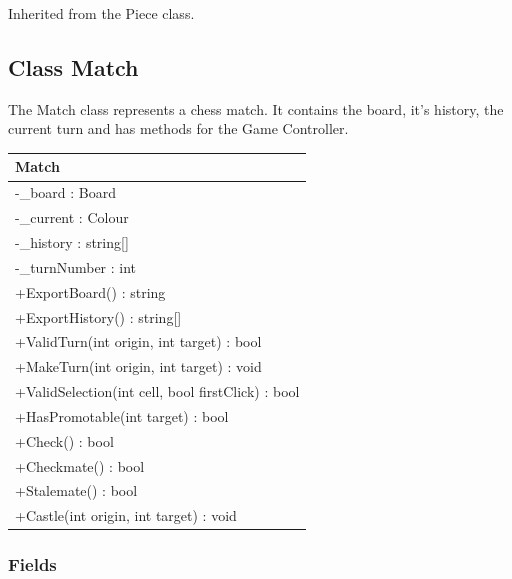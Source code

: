 \documentclass[12pt]{article}
\begin{document}
    Inherited from the Piece class.

\newpage


\subsection{Class Match}

The Match class represents a chess match. It contains the board, it's history, the current turn and has methods for the Game Controller.

\begin{table}[H]
    \begin{tabular}{|l|}
    \hline
    \rowcolor[HTML]{C0C0C0} 
    \textbf{Match}                                    \\ \hline
    \rowcolor[HTML]{EFEFEF} 
    -\_board : Board                                  \\ \hline
    \rowcolor[HTML]{EFEFEF} 
    -\_current : Colour                               \\ \hline
    \rowcolor[HTML]{EFEFEF} 
    -\_history : string{[}{]}                         \\ \hline
    \rowcolor[HTML]{EFEFEF} 
    -\_turnNumber : int                               \\ \hline
    +ExportBoard() : string                           \\ \hline
    +ExportHistory() : string[]                       \\ \hline
    +ValidTurn(int origin, int target) : bool         \\ \hline
    +MakeTurn(int origin, int target) : void          \\ \hline
    +ValidSelection(int cell, bool firstClick) : bool \\ \hline
    +HasPromotable(int target) : bool                 \\ \hline
    +Check() : bool                                   \\ \hline
    +Checkmate() : bool                               \\ \hline
    +Stalemate() : bool                               \\ \hline
    +Castle(int origin, int target) : void            \\ \hline
\end{tabular}
\end{table}

\subsubsection{Fields}
\end{document}
